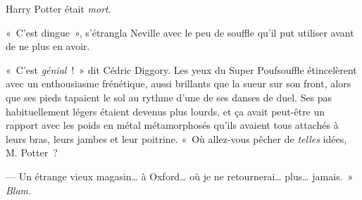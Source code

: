Harry Potter était \emph{mort}.

\later

«~C'est dingue~», s'étrangla Neville avec le peu de souffle qu'il put utiliser avant de ne plus en avoir.

«~C'est \emph{génial}~!~»
dit Cédric Diggory.
Les yeux du Super Poufsouffle étincelèrent avec un enthousiasme frénétique, aussi brillants que la sueur sur son front, alors que ses pieds tapaient le sol au rythme d'une de ses danses de duel.
Ses pas habituellement légers étaient devenus plus lourds, et ça avait peut-être un rapport avec les poids en métal métamorphosés qu'ils avaient tous attachés à leurs bras, leurs jambes et leur poitrine.
«~Où allez-vous pêcher de \emph{telles} idées, M. Potter~?

--- Un étrange vieux magasin… à Oxford… où je ne retournerai… plus… jamais.~»
\emph{Blam.}
